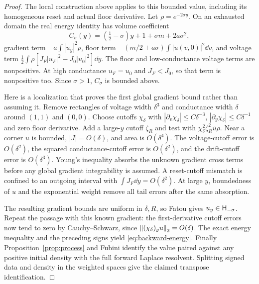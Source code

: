 \begin{proof}
The local construction above applies to this bounded value,
including its homogeneous reset and actual floor derivative.
Let $\rho=e^{-2\sigma y}$. On an exhausted domain the real
energy identity has volume coefficient
\[
 C_\sigma(y)=(\tfrac12-\sigma)y+1+\sigma m+2a\sigma^2,
\]
gradient term $-a\int|u_y|^2\rho$, floor term
$-(m/2+a\sigma)\int|u(v,0)|^2\dd v$, and voltage term
$\frac12\int\rho[J_F|u_F|^2-J_0|u_0|^2]\dd y$.
The floor and low-conductance voltage terms are nonpositive.
At high conductance $u_F=u_0$ and $J_F<J_0$, so that term is
nonpositive too. Since $\sigma>1$, $C_\sigma$ is bounded above.

Here is a localization that proves the first global gradient
bound rather than assuming it. Remove rectangles of voltage
width $\delta^3$ and conductance width $\delta$ around $(1,1)$
and $(0,0)$. Choose cutoffs $\chi_\delta$ with
$|\partial_v\chi_\delta|\le C\delta^{-3}$,
$|\partial_y\chi_\delta|\le C\delta^{-1}$ and zero floor
derivative. Add a large-$y$ cutoff $\zeta_R$ and test with
$\chi_\delta^2\zeta_R^2\overline u\rho$.
Near a corner $u$ is bounded, $|J|=O(\delta)$, and area is
$O(\delta^4)$. The voltage-cutoff error is $O(\delta^2)$,
the squared conductance-cutoff error is $O(\delta^2)$, and the
drift-cutoff error is $O(\delta^3)$. Young's inequality absorbs
the unknown gradient cross terms before any global gradient
integrability is assumed. A reset-cutoff mismatch is confined
to an outgoing interval with $\int J_F\dd y=O(\delta^2)$.
At large $y$, boundedness of $u$ and the exponential weight
remove all tail errors after the same absorption.

The resulting gradient bounds are uniform in $\delta,R$,
so Fatou gives $u_y\in\mathsf H_{-\sigma}$. Repeat the passage with
this known gradient: the first-derivative cutoff errors now
tend to zero by Cauchy--Schwarz, since
$\left\|(\chi_\delta)_yu\right\|_2=O(\delta)$.
The exact energy inequality and the preceding signs yield
\eqref{eq:backward-energy}. Finally Proposition~\ref{prop:process}
and Fubini identify the value paired against any positive
initial density with the full forward Laplace resolvent.
Splitting signed data and density in the weighted spaces
give the claimed transpose identification.
\end{proof}
